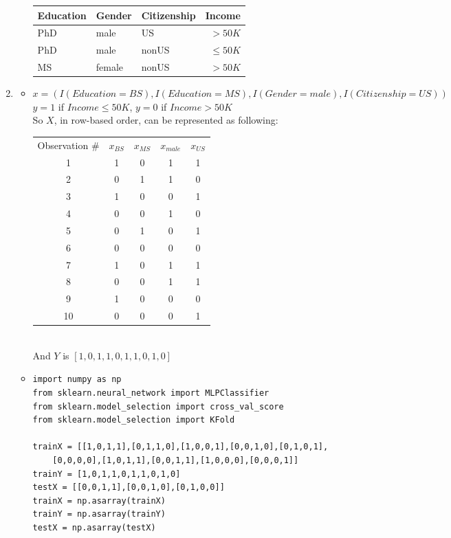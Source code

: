\documentclass[11pt]{article}
\begin{document}
\begin{onehalfspace}
\begin{enumerate}[label=\alph*]
\begin{itemize}
		\begin{tabular}{| l | l | l | r |}
		\hline
		Education & Gender & Citizenship & Income \\ \hline
		PhD & male & US & $>50K$ \\ \hline
		PhD & male & nonUS & $\leq 50K$ \\ \hline
		MS & female & nonUS & $>50K$ \\ \hline
		\end{tabular}
	\end{itemize}
	\item
	\begin{itemize}
		\item
		$x = (I(Education=BS), I(Education=MS), I(Gender=male), I(Citizenship=US))$\\
		$y = 1$ if $Income \leq 50K$, $y = 0$ if $Income > 50K$\\
		So $X$, in row-based order, can be represented as following:\\
		\begin{tabular}{c | c  c  c  c}
		Observation \# & $x_{BS}$ & $x_{MS}$ & $x_{male}$ & $x_{US}$\\
		1 & 1&0&1&1\\ \hline
		2 & 0&1&1&0\\ \hline
		3 & 1&0&0&1\\ \hline
		4 & 0&0&1&0\\ \hline
		5 & 0&1&0&1\\ \hline
		6 & 0&0&0&0\\ \hline
		7 & 1&0&1&1\\ \hline
		8 & 0&0&1&1\\ \hline
		9 & 1&0&0&0\\ \hline
		10 & 0&0&0&1\\ \hline
		\end{tabular}\\
		And $Y$ is $[1,0,1,1,0,1,1,0,1,0]$
		\item
		\begin{verbatim}
import numpy as np
from sklearn.neural_network import MLPClassifier
from sklearn.model_selection import cross_val_score
from sklearn.model_selection import KFold

trainX = [[1,0,1,1],[0,1,1,0],[1,0,0,1],[0,0,1,0],[0,1,0,1],
	[0,0,0,0],[1,0,1,1],[0,0,1,1],[1,0,0,0],[0,0,0,1]]
trainY = [1,0,1,1,0,1,1,0,1,0]
testX = [[0,0,1,1],[0,0,1,0],[0,1,0,0]]
trainX = np.asarray(trainX)
trainY = np.asarray(trainY)
testX = np.asarray(testX)


\end{verbatim}
\end{itemize}
\end{enumerate}
\end{onehalfspace}
\end{document}
